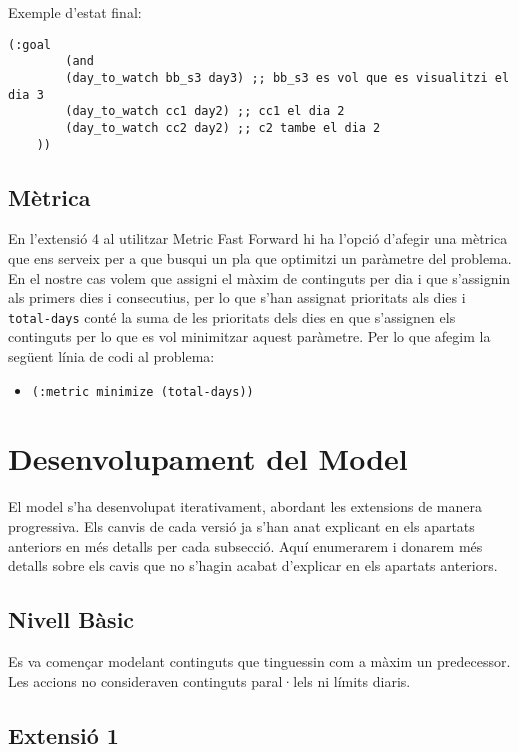 \documentclass[a4paper]{article}
\begin{document}
	Exemple d’estat final:
	
	\begin{lstlisting}[language=PDDL, caption={Exemple de \textit{goal} del problema}, label={lst:goal_problema}]
	(:goal
		(and
		(day_to_watch bb_s3 day3) ;; bb_s3 es vol que es visualitzi el dia 3
		(day_to_watch cc1 day2) ;; cc1 el dia 2
		(day_to_watch cc2 day2) ;; c2 tambe el dia 2
	))
	\end{lstlisting}
	
	\subsection{Mètrica}
	En l'extensió 4 al utilitzar Metric Fast Forward hi ha l'opció d'afegir una mètrica que ens serveix per a que busqui un pla que optimitzi un paràmetre del problema. En el nostre cas volem que assigni el màxim de continguts per dia i que s'assignin als primers dies i consecutius, per lo que s'han assignat prioritats als dies i \texttt{total-days} conté la suma de les prioritats dels dies en que s'assignen els continguts per lo que es vol minimitzar aquest paràmetre. Per lo que afegim la següent línia de codi al problema:
		\begin{itemize}
		\item \texttt{(:metric minimize (total-days))} 
	
	\end{itemize}
	
	
	
	
	\newpage
	\section{Desenvolupament del Model}
	
	El model s'ha desenvolupat iterativament, abordant les extensions de manera progressiva. Els canvis de cada versió ja s'han anat explicant en els apartats anteriors en més detalls per cada subsecció. Aquí enumerarem i donarem més detalls sobre els cavis que no s'hagin acabat d'explicar en els apartats anteriors.
	
	\subsection{Nivell Bàsic}
	
	Es va començar modelant continguts que tinguessin com a màxim un predecessor. Les accions no consideraven continguts paral·lels ni límits diaris.
	
	\subsection{Extensió 1}
	
\end{document}
